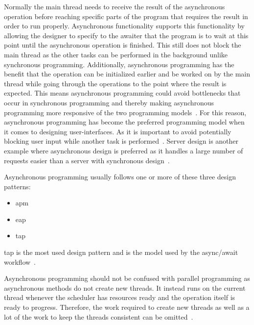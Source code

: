 Normally the main thread needs to receive the result of the asynchronous operation before reaching specific parts of the program that requires the result in order to run properly. Asynchronous functionality supports this functionality by allowing the designer to specify to the awaiter that the program is to wait at this point until the asynchronous operation is finished. This still does not block the main thread as the other tasks can be performed in the background unlike synchronous programming. Additionally, asynchronous programming has the benefit that the operation can be initialized earlier and be worked on by the main thread while going through the operations to the point where the result is expected. This means asynchronous programming could avoid bottlenecks that occur in synchronous programming and thereby making asynchronous programming more responsive of the two programming models~\cite{DOC:TaskAsyncProgModel, WEB:AsyncAwaitTut}.
For this reason, asynchronous programming has become the preferred programming model when it comes to designing user-interfaces. As it is important to avoid potentially blocking user input while another task is performed~\cites{VIDEO:AsyncConBack}[p.~214]{BOOK:DotnetMultithreadCookBook}. Server design is another example where asynchronous design is preferred as it handles a large number of requests easier than a server with synchronous design~\cite{VIDEO:AsyncConBack, DOC:AsyncAwait}.

Asynchronous programming usually follows one or more of these three design patterns:
\begin{itemize}
	\item{\ac{apm}}
	\item{\ac{eap}}	
	\item{\ac{tap}}
\end{itemize}
\ac{tap} is the most used design pattern and is the model used by the async/await workflow~\cite{DOC:AsyncAwait, WEB:AsyncAwaitTut}.

Asynchronous programming should not be confused with parallel programming as asynchronous methods do not create new threads. It instead runs on the current thread whenever the scheduler has resources ready and the operation itself is ready to progress. Therefore, the work required to create new threads as well as a lot of the work to keep the threads consistent can be omitted~\cite{DOC:TaskAsyncProgModel}. %

